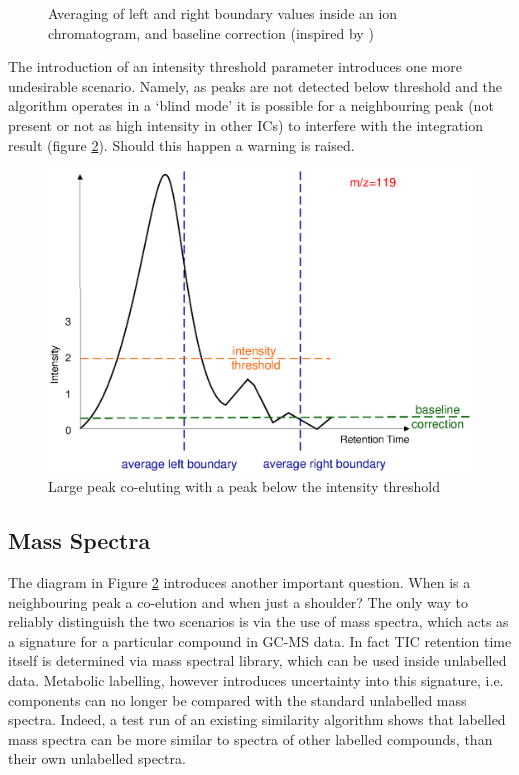 \begin{figure}
\begin{center}
  \end{center}
  \caption{Averaging of left and right boundary values inside an ion chromatogram,
and baseline correction (inspired by \cite{anto07})}
  \label{fig:88}
\end{figure}

The introduction of an intensity threshold parameter introduces one more 
undesirable scenario. Namely, as peaks are not detected below threshold and
the algorithm operates in a ‘blind mode’ it is possible for a neighbouring
peak (not present or not as high intensity in other ICs) to interfere with
the integration result (figure \ref{fig:89}). Should this happen a warning
is raised.

\begin{figure}
  \begin{center}
    \includegraphics[scale=0.5]{graphics/chapter08/89.eps}
  \end{center}
  \caption{Large peak co-eluting with a peak below the intensity threshold}
  \label{fig:89}
\end{figure}

\subsection{Mass Spectra}

The diagram in Figure \ref{fig:89} introduces another important question. 
When is a neighbouring peak a co-elution and when just a shoulder? The only way 
to reliably distinguish the two scenarios is via the use of mass spectra, which 
acts as a signature for a particular compound in GC-MS data. In fact TIC 
retention time itself is determined via mass spectral library, which can be 
used inside unlabelled data. Metabolic labelling, however introduces uncertainty 
into this signature, i.e. components can no longer be compared with the standard 
unlabelled mass spectra. Indeed, a test run of an existing similarity algorithm 
\cite{Robinson07} shows that labelled mass spectra can be more similar 
to spectra of other labelled compounds, than their own unlabelled spectra.

